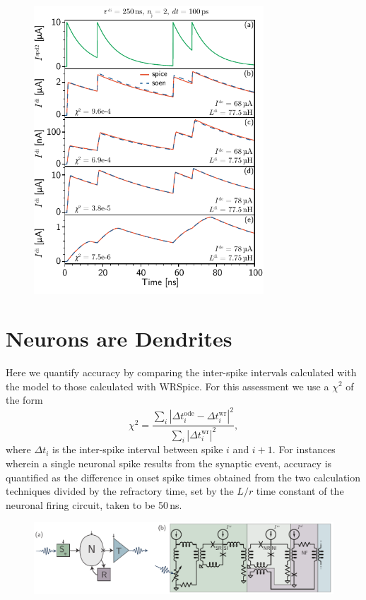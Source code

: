\documentclass[twocolumn]{article}
\begin{document}
\begin{figure}[h!]
\includegraphics[width=8.6cm]{figures/_fig__synapses__comparison__2jj__pulse_sequence.pdf}
\end{figure}

\section{\label{sec:neurons}Neurons are Dendrites}



Here we quantify accuracy by comparing the inter-spike intervals calculated with the model to those calculated with WRSpice. For this assessment we use a $\chi^2$ of the form
\begin{equation}
\label{eq:chi_squared__ISI}
\chi^2 = \frac{ \sum_i \left| \Delta t_i^{\mathrm{ode}} - \Delta t_i^{\mathrm{wr}} \right|^2 }{ \sum_i \left| \Delta t_i^{\mathrm{wr}} \right|^2 },
\end{equation}
where $\Delta t_i$ is the inter-spike interval between spike $i$ and $i+1$. For instances wherein a single neuronal spike results from the synaptic event, accuracy is quantified as the difference in onset spike times obtained from the two calculation techniques divided by the refractory time, set by the $L/r$ time constant of the neuronal firing circuit, taken to be 50\,ns.

\begin{figure}[h!]
\includegraphics[width=17.2cm]{figures/_fig__neuron__one_synapse__schematic__circuit.pdf}
\end{figure}
\end{document}
